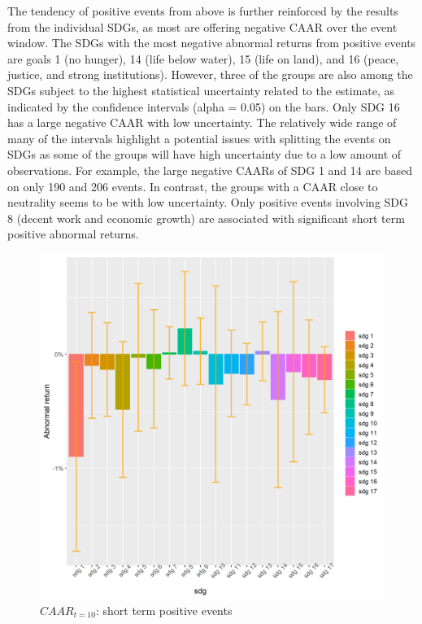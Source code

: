 The tendency of positive events from above is further reinforced by the results from the individual SDGs, as most are offering negative CAAR over the event window. The SDGs with the most negative abnormal returns from positive events are goals 1 (no hunger), 14 (life below water), 15 (life on land), and 16 (peace, justice, and strong institutions). However, three of the groups are also among the SDGs subject to the highest statistical uncertainty related to the estimate, as indicated by the confidence intervals (alpha = 0.05) on the bars. Only SDG 16 has a large negative CAAR with low uncertainty. The relatively wide range of many of the intervals highlight a potential issues with splitting the events on SDGs as some of the groups will have high uncertainty due to a low amount of observations. For example, the large negative CAARs of SDG 1 and 14 are based on only 190 and 206 events. In contrast, the groups with a CAAR close to neutrality seems to be with low uncertainty.  
Only positive events involving SDG 8 (decent work and economic growth) are associated with significant short term positive abnormal returns. 
 
\begin{figure} [H]
    \centering
    \includegraphics[scale=0.6]{Projekt/1.Figures analysis/ST_positive_sdg_bar.png}
    \caption{$CAAR_{t=10}$: short term positive events}
    \label{fig:ST_pos_bar}
\end{figure}

